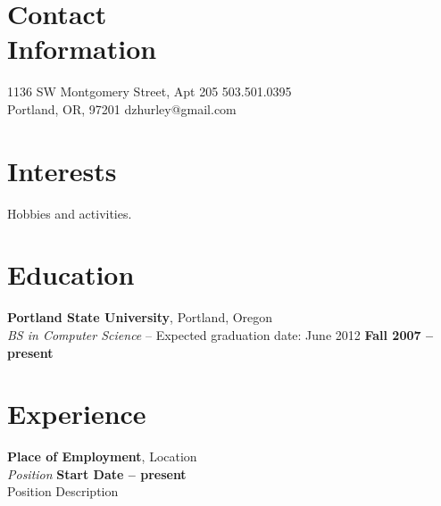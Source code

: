 \documentclass[margin,line]{resume}
\begin{document}
\begin{resume}

    \section{\mysidestyle Contact\\Information}

    1136 SW Montgomery Street, Apt 205                     \hfill 503.501.0395          \vspace{0mm}\\\vspace{0mm}%
    Portland, OR, 97201                                    \hfill dzhurley@gmail.com    \vspace{0mm}\\\vspace{0mm}%

    \section{\mysidestyle Interests}

    Hobbies and activities.

    \section{\mysidestyle Education}

    \textbf{Portland State University}, Portland, Oregon \vspace{2mm}\\\vspace{1mm}%
    \textsl{BS in Computer Science} -- Expected graduation date: June 2012 
    \hfill \textbf{ Fall 2007 -- present}\vspace{-3mm}\\\vspace{-1mm}%

    \section{\mysidestyle Experience}

    \textbf{Place of Employment}, Location \vspace{2mm}\\\vspace{1mm}%
    \textsl{Position} \hfill \textbf{Start Date -- present}\\
    Position Description


\end{resume}
\end{document}

